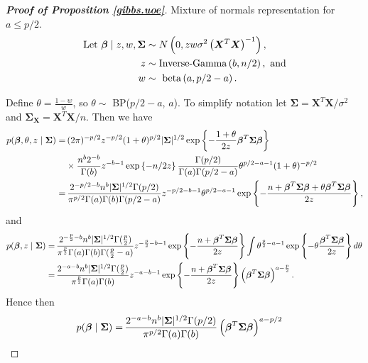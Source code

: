 \documentclass[12pt]{article}
\newcommand{\X}{{\bm  X}}
\newcommand{\Sigmabf}{{\mathbf \Sigma}}
\newcommand{\greekbold}[1]{\mbox{\boldmath $#1$}}
\newcommand{\betabf}{\greekbold{\beta}}
\begin{document}
\begin{proof} [\textbf{Proof of Proposition \ref{gibbs.uoe}}]
Mixture of normals representation for $a \leq p/2$.
\begin{align*}
\text{Let } \betabf\mid z, w, \Sigmabf &\sim N\left(0, z w \sigma^2 \left(\X^T\X\right)^{-1} \right), \\
z &\sim \text{Inverse-Gamma}\left(  b, n/2\right), \text{ and} \\
w &\sim \text{ beta}\left( a, p/2-a \right).
\end{align*}

Define $\theta = \frac{1-w}{w}$, so $\theta \sim $ BP($p/2-a$, $a$). To simplify notation let $\Sigmabf = \X^T\X /\sigma^2$ and $\Sigmabf_\X = \X^T\X/n$.
Then we have
\begin{align*}
p(\betabf, \theta, z \mid  \Sigmabf) =& \, (2\pi)^{-p/2} z^{-p/2} (1+\theta)^{p/2} |\Sigmabf|^{1/2} \exp \left\{ -\frac{1+\theta}{2z}\betabf^T\Sigmabf\betabf \right\}\\
&\times \frac{n^b 2^{-b}}{\Gamma(b)}  z^{-b-1} \exp\left\{ -n/2z \right\}
\frac{\Gamma(p/2)}{\Gamma(a)\Gamma(p/2-a)} \theta^{p/2-a-1}(1+\theta)^{-p/2} \\
=& \, \frac{2^{-p/2-b}n^{b}|\Sigmabf|^{1/2}\Gamma(p/2)}{\pi^{p/2}\Gamma(a)\Gamma(b)\Gamma(p/2-a)}
z^{-p/2-b-1} \theta^{p/2-a-1} \exp \left\{ -\frac{n+\betabf^T\Sigmabf\betabf + \theta\betabf^T\Sigmabf\betabf}{2z} \right\} ,
\end{align*}
and
\begin{align*}
p(\betabf,z\mid \Sigmabf) =& \, \frac{2^{-\frac{p}{2}-b}n^{b} |\Sigmabf|^{1/2} \Gamma(\frac{p}{2})}{\pi^{\frac{p}{2}}\Gamma(a)\Gamma(b)\Gamma(\frac{p}{2}-a)} z^{-\frac{p}{2}-b-1} \exp \left\{ -\frac{n+\betabf^T\Sigmabf\betabf}{2z} \right\}
\int \theta^{\frac{p}{2}-a-1} \exp \left\{ -\theta \frac{\betabf^T\Sigmabf\betabf}{2z} \right\} d\theta\\
=& \, \frac{2^{-a-b} n^{b}|\Sigmabf|^{1/2}\Gamma(\frac{p}{2})}{\pi^{\frac{p}{2}}\Gamma(a)\Gamma(b)} z^{-a-b-1} \exp \left\{ -\frac{n+\betabf^T\Sigmabf\betabf}{2z} \right\} \left( \betabf^T\Sigmabf\betabf \right)^{a-\frac{p}{2}}.
\end{align*}
Hence then
\begin{align*}
p(\betabf\mid \Sigmabf) =& \, \frac{2^{-a-b}n^b|\Sigmabf|^{1/2}\Gamma(p/2)}{\pi^{p/2}\Gamma(a)\Gamma(b)} \left( \betabf^T\Sigmabf\betabf \right)^{a-p/2}

\end{align*}
\end{proof}
\end{document}
